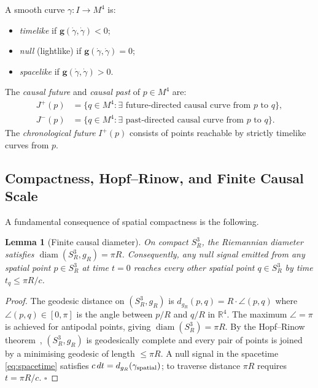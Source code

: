 \documentclass[12pt,a4paper]{article}
\theoremstyle{plain}
\newtheorem{lemma}[theorem]{Lemma}
\theoremstyle{definition}
\theoremstyle{remark}
\newcommand{\diam}{\operatorname{diam}}
\begin{document}
\begin{tcolorbox}[defbox={Definition 2.2 — Causal Structure}]
A smooth curve $\gamma : I \to M^4$ is:
\begin{itemize}[leftmargin=1.4em]
  \item \emph{timelike} if $\mathbf{g}(\dot\gamma,\dot\gamma) < 0$;
  \item \emph{null} (lightlike) if $\mathbf{g}(\dot\gamma,\dot\gamma) = 0$;
  \item \emph{spacelike} if $\mathbf{g}(\dot\gamma,\dot\gamma) > 0$.
\end{itemize}
The \emph{causal future} and \emph{causal past} of $p \in M^4$ are:
\begin{align}
  J^+(p) &= \{q \in M^4 : \exists\text{ future-directed causal curve from }p\text{ to }q\},\\
  J^-(p) &= \{q \in M^4 : \exists\text{ past-directed causal curve from }p\text{ to }q\}.
\end{align}
The \emph{chronological future} $I^+(p)$ consists of points reachable by
strictly timelike curves from $p$.
\end{tcolorbox}

\subsection{Compactness, Hopf--Rinow, and Finite Causal Scale}

A fundamental consequence of spatial compactness is the following.

\begin{lemma}[Finite causal diameter]
\label{lem:diam}
On compact $S^3_R$, the Riemannian diameter satisfies
$\diam(S^3_R, g_R) = \pi R$.
Consequently, any null signal emitted from any spatial point $p \in S^3_R$
at time $t = 0$ reaches every other spatial point $q \in S^3_R$ by time
$t_q \le \pi R / c$.
\end{lemma}

\begin{proof}
The geodesic distance on $(S^3_R, g_R)$ is $d_{g_R}(p,q) = R \cdot \angle(p,q)$
where $\angle(p,q) \in [0, \pi]$ is the angle between $p/R$ and $q/R$ in $\mathbb{R}^4$.
The maximum $\angle = \pi$ is achieved for antipodal points, giving
$\diam(S^3_R) = \pi R$.
By the Hopf--Rinow theorem~\cite{doC92}, $(S^3_R, g_R)$ is geodesically complete
and every pair of points is joined by a minimising geodesic of length $\le \pi R$.
A null signal in the spacetime \eqref{eq:spacetime} satisfies
$c\,dt = d_{g_R}(\gamma_{\rm spatial})$; to traverse distance $\pi R$ requires
$t = \pi R/c$.
\hfill$\square$
\end{proof}
\end{document}
